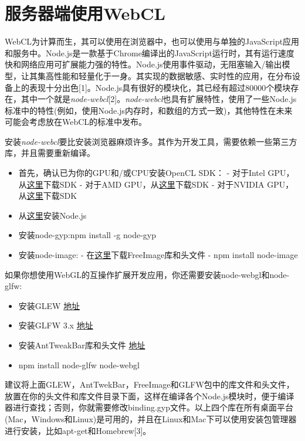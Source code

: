 \section{服务器端使用WebCL}

WebCL为计算而生，其可以使用在浏览器中，也可以使用与单独的JavaScript应用和服务中。Node.js是一款基于Chrome编译出的JavaScript运行时，其有运行速度快和网络应用可扩展能力强的特性。Node.js使用事件驱动，无阻塞输入/输出模型，让其集高性能和轻量化于一身。其实现的数据敏感、实时性的应用，在分布设备上的表现十分出色[1]。Node.js具有很好的模块化，其已经有超过80000个模块存在，其中一个就是\emph{node-webcl}[2]。\emph{node-webcl}也具有扩展特性，使用了一些Node.js标准中的特性(例如，使用Node.js内存时，和数组的方式一致)，其他特性在未来可能会考虑放在WebCL的标准中发布。

安装\emph{node-webcl}要比安装浏览器麻烦许多。其作为开发工具，需要依赖一些第三方库，并且需要重新编译。

\begin{itemize}
\item 首先，确认已为你的GPU和/或CPU安装OpenCL SDK： - 对于Intel GPU，从\href{https://software.intel.com/en-us/vcsource/tools/opencl-sdk}{这里}下载SDK - 对于AMD GPU，从\href{https://developer.amd.com/tools-and-sdks/opencl-zone/amd-accelerated-paralled-processing-app-sdk}{这里}下载SDK - 对于NVIDIA GPU，从\href{https://developer.nvidia.com/opencl}{这里}下载SDK
\item 从\href{http://nodejs.org}{这里}安装Node.js
\item 安装node-gyp:npm install -g node-gyp
\item 安装node-image: - 在\href{http://freeimage.sourceforge.net}{这里}下载FreeImage库和头文件 - npm install node-image
\end{itemize}

如果你想使用WebGL的互操作扩展开发应用，你还需要安装node-webgl和node-glfw:

\begin{itemize}
\item 安装GLEW \href{http://glew.sourceforge.net}{地址}
\item 安装GLFW 3.x \href{http://www.glfw.org}{地址}
\item 安装AntTweakBar库和头文件 \href{http://anttweakbar.sourceforge.net}{地址}
\item npm install node-glfw node-webgl
\end{itemize}

建议将上面GLEW，AntTwekBar，FreeImage和GLFW包中的库文件和头文件，放置在你的头文件和库文件目录下面，这样在编译各个Node.js模块时，便于编译器进行查找；否则，你就需要修改binding.gyp文件。以上四个库在所有桌面平台(Mac，Windows和Linux)是可用的，并且在Linux和Mac下可以使用安装包管理器进行安装，比如apt-get和Homebrew[3]。

